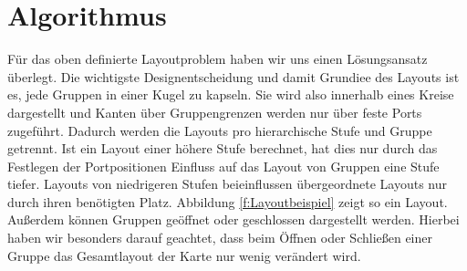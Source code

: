 \chapter{Algorithmus} %



Für das oben definierte Layoutproblem haben wir uns einen Lösungsansatz überlegt.
Die wichtigste Designentscheidung und damit Grundiee des Layouts ist es, jede Gruppen in einer Kugel zu kapseln. Sie wird also innerhalb eines Kreise dargestellt und Kanten über Gruppengrenzen werden nur über feste Ports zugeführt.
Dadurch werden die Layouts pro hierarchische Stufe und Gruppe getrennt. 
Ist ein Layout einer höhere Stufe berechnet, hat dies nur durch das Festlegen der Portpositionen Einfluss auf das Layout von Gruppen eine Stufe tiefer.  Layouts von niedrigeren Stufen beieinflussen übergeordnete Layouts nur durch ihren benötigten Platz.
Abbildung \ref{f:Layoutbeispiel} zeigt so ein Layout.
Außerdem können Gruppen geöffnet oder geschlossen dargestellt werden. 
Hierbei haben wir besonders darauf geachtet, dass beim Öffnen oder Schließen einer Gruppe das Gesamtlayout der Karte nur wenig verändert wird.


